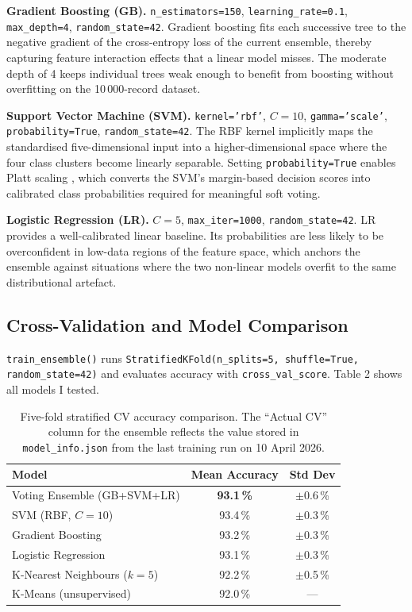 \documentclass[12pt,a4paper]{article}
\begin{document}
\noindent\textbf{Gradient Boosting (GB).}
\texttt{n\_estimators=150}, \texttt{learning\_rate=0.1},
\texttt{max\_depth=4}, \texttt{random\_state=42}.
Gradient boosting fits each successive tree to the negative
gradient of the cross-entropy loss of the current ensemble, thereby
capturing feature interaction effects that a linear model misses.
The moderate depth of 4 keeps individual trees weak enough to
benefit from boosting without overfitting on the 10\,000-record
dataset.

\noindent\textbf{Support Vector Machine (SVM).}
\texttt{kernel='rbf'}, $C=10$, \texttt{gamma='scale'},
\texttt{probability=True}, \texttt{random\_state=42}.
The RBF kernel implicitly maps the standardised five-dimensional
input into a higher-dimensional space where the four class clusters
become linearly separable. Setting \texttt{probability=True}
enables Platt scaling \cite{platt1999}, which converts the SVM's
margin-based decision scores into calibrated class probabilities
required for meaningful soft voting.

\noindent\textbf{Logistic Regression (LR).}
$C=5$, \texttt{max\_iter=1000}, \texttt{random\_state=42}.
LR provides a well-calibrated linear baseline. Its probabilities
are less likely to be overconfident in low-data regions of the
feature space, which anchors the ensemble against situations where
the two non-linear models overfit to the same distributional
artefact.

\subsection{Cross-Validation and Model Comparison}

\texttt{train\_ensemble()} runs \texttt{StratifiedKFold(n\_splits=5,
shuffle=True, random\_state=42)} and evaluates accuracy with
\texttt{cross\_val\_score}. Table 2 shows all models I tested.

\begin{table}[H]
  \centering
  \caption{Five-fold stratified CV accuracy comparison.
           The ``Actual CV'' column for the ensemble reflects
           the value stored in \texttt{model\_info.json} from the
           last training run on 10 April 2026.}
  \begin{tabular}{lcc}
    \toprule
    \textbf{Model} & \textbf{Mean Accuracy} & \textbf{Std Dev} \\
    \midrule
    Voting Ensemble (GB+SVM+LR) & \textbf{93.1\,\%} & $\pm$0.6\,\% \\
    SVM (RBF, $C=10$)           & 93.4\,\%           & $\pm$0.3\,\% \\
    Gradient Boosting           & 93.2\,\%           & $\pm$0.3\,\% \\
    Logistic Regression         & 93.1\,\%           & $\pm$0.3\,\% \\
    K-Nearest Neighbours ($k=5$) & 92.2\,\%          & $\pm$0.5\,\% \\
    K-Means (unsupervised)       & 92.0\,\%          & ---           \\
    \bottomrule
  \end{tabular}
\end{table}
\end{document}

